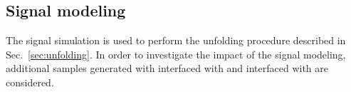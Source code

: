 \subsection{Signal modeling}

The signal simulation is used to perform the unfolding procedure
described in Sec.~\ref{sec:unfolding}. In order to investigate the
impact of the \ttbar{} signal modeling, additional samples generated
with \powheg{} interfaced with \herwig{} and \mcatnlo{}
interfaced with \herwig{} are considered. 